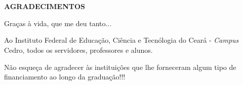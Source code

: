 \chapter*{}
\vspace{-4cm}
\begin{center}
 \textbf{AGRADECIMENTOS}
\end{center}

\vspace{0.5cm}
Graças à vida, que me deu tanto...

Ao Instituto Federal de Educação, Ciência e Tecnólogia do Ceará - \textit{Campus} Cedro, todos os servidores, professores e alunos.

Não esqueça de agradecer às instituições que lhe forneceram algum tipo de financiamento ao longo da graduação!!!



